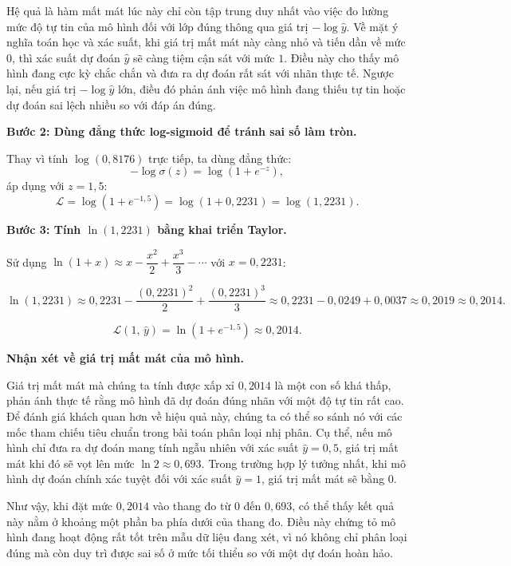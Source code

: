 \documentclass[12pt,a4paper]{article}
\begin{document}
Hệ quả là hàm mất mát lúc này chỉ còn tập trung duy nhất vào việc đo lường mức độ tự tin của mô hình đối với lớp đúng thông qua giá trị $-\log\hat{y}$. Về mặt ý nghĩa toán học và xác suất, khi giá trị mất mát này càng nhỏ và tiến dần về mức $0$, thì xác suất dự đoán $\hat{y}$ sẽ càng tiệm cận sát với mức $1$. Điều này cho thấy mô hình đang cực kỳ chắc chắn và đưa ra dự đoán rất sát với nhãn thực tế. Ngược lại, nếu giá trị $-\log\hat{y}$ lớn, điều đó phản ánh việc mô hình đang thiếu tự tin hoặc dự đoán sai lệch nhiều so với đáp án đúng.

\medskip

\noindent\textbf{Bước 2: Dùng đẳng thức log-sigmoid để tránh sai số làm tròn.}

Thay vì tính $\log(0{,}8176)$ trực tiếp, ta dùng đẳng thức:
\[
  -\log\sigma(z) = \log\!\left(1 + e^{-z}\right),
\]
áp dụng với $z = 1{,}5$:
\[
  \mathcal{L}
  = \log\!\left(1 + e^{-1{,}5}\right)
  = \log(1 + 0{,}2231)
  = \log(1{,}2231).
\]

\medskip

\noindent\textbf{Bước 3: Tính $\ln(1{,}2231)$ bằng khai triển Taylor.}

Sử dụng $\ln(1+x) \approx x - \dfrac{x^2}{2} + \dfrac{x^3}{3} - \cdots$
với $x = 0{,}2231$:

\[
  \ln(1{,}2231)
  \approx 0{,}2231 - \frac{(0{,}2231)^2}{2} + \frac{(0{,}2231)^3}{3}
  \approx 0{,}2231 - 0{,}0249 + 0{,}0037
  \approx 0{,}2019
  \approx 0{,}2014.
\]

\begin{ketqua}
\[
  \mathcal{L}(1,\,\hat{y})
  = \ln\!\left(1 + e^{-1{,}5}\right)
  \approx \boxed{0{,}2014}.
\]
\end{ketqua}

\textbf{Nhận xét về giá trị mất mát của mô hình.}

Giá trị mất mát mà chúng ta tính được xấp xỉ $0,2014$ là một con số khá thấp, phản ánh thực tế rằng mô hình đã dự đoán đúng nhãn với một độ tự tin rất cao. Để đánh giá khách quan hơn về hiệu quả này, chúng ta có thể so sánh nó với các mốc tham chiếu tiêu chuẩn trong bài toán phân loại nhị phân. Cụ thể, nếu mô hình chỉ đưa ra dự đoán mang tính ngẫu nhiên với xác suất $\hat{y} = 0,5$, giá trị mất mát khi đó sẽ vọt lên mức $\ln 2 \approx 0,693$. Trong trường hợp lý tưởng nhất, khi mô hình dự đoán chính xác tuyệt đối với xác suất $\hat{y} = 1$, giá trị mất mát sẽ bằng $0$. 

Như vậy, khi đặt mức $0,2014$ vào thang đo từ $0$ đến $0,693$, có thể thấy kết quả này nằm ở khoảng một phần ba phía dưới của thang đo. Điều này chứng tỏ mô hình đang hoạt động rất tốt trên mẫu dữ liệu đang xét, vì nó không chỉ phân loại đúng mà còn duy trì được sai số ở mức tối thiểu so với một dự đoán hoàn hảo.
\end{document}
